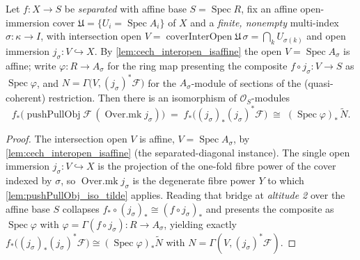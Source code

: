 \begin{lemma}

  \label{lem:coverinter_lhs_iso_tilde}
  Let \(f : X \to S\) be \emph{separated} with affine base \(S = \operatorname{Spec} R\), fix an
  affine open-immersion cover \(\mathfrak{U} = \{U_i = \operatorname{Spec} A_i\}\) of \(X\) and a
  \emph{finite, nonempty} multi-index \(\sigma : \kappa \to I\), with intersection open
  \(V = \operatorname{coverInterOpen}\mathfrak{U}\,\sigma = \bigcap_k U_{\sigma(k)}\) and open
  immersion \(j_\sigma : V \hookrightarrow X\). By \cref{lem:cech_interopen_isaffine} the open
  \(V = \operatorname{Spec} A_\sigma\) is affine; write \(\varphi : R \to A_\sigma\) for the ring
  map presenting the composite \(f \circ j_\sigma : V \to S\) as \(\operatorname{Spec}\varphi\),
  and \(N = \Gamma\bigl(V, (j_\sigma)^*\mathcal{F}\bigr)\) for the \(A_\sigma\)-module of sections
  of the (quasi-coherent) restriction. Then there is an isomorphism of
  \(\mathcal{O}_S\)-modules
  \[
    f_*\bigl(\operatorname{pushPullObj}\mathcal{F}\,(\operatorname{Over.mk} j_\sigma)\bigr)
      \;=\; f_*\bigl((j_\sigma)_* (j_\sigma)^*\mathcal{F}\bigr)
      \;\cong\; (\operatorname{Spec}\varphi)_*\,\widetilde{N}.
  \]
\end{lemma}
\begin{proof}
  The intersection open \(V\) is affine, \(V = \operatorname{Spec} A_\sigma\), by
  \cref{lem:cech_interopen_isaffine} (the separated-diagonal instance). The single open
  immersion \(j_\sigma : V \hookrightarrow X\) is the projection of the one-fold fibre power of
  the cover indexed by \(\sigma\), so \(\operatorname{Over.mk} j_\sigma\) is the degenerate fibre
  power \(Y\) to which \cref{lem:pushPullObj_iso_tilde} applies. Reading that bridge at
  \emph{altitude 2} over the affine base \(S\) collapses
  \(f_* \circ (j_\sigma)_* \cong (f \circ j_\sigma)_*\) and presents the composite as
  \(\operatorname{Spec}\varphi\) with \(\varphi = \Gamma(f \circ j_\sigma) : R \to A_\sigma\),
  yielding exactly
  \(f_*\bigl((j_\sigma)_*(j_\sigma)^*\mathcal{F}\bigr) \cong
  (\operatorname{Spec}\varphi)_*\widetilde{N}\) with
  \(N = \Gamma(V, (j_\sigma)^*\mathcal{F})\).
\end{proof}

